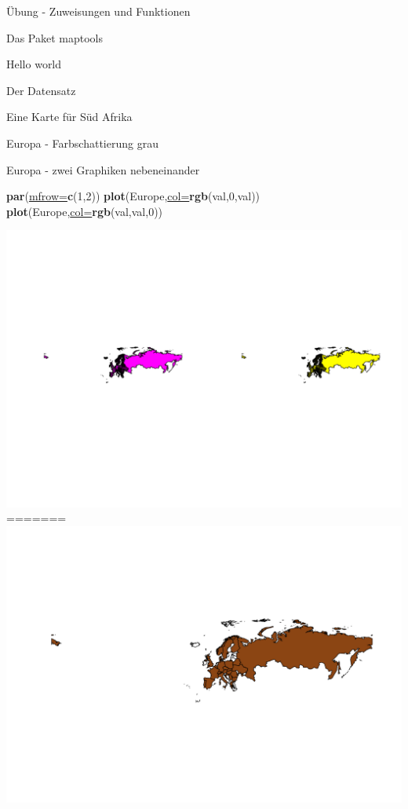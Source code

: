 \documentclass[ignorenonframetext,]{beamer}
\newenvironment{Shaded}{\begin{snugshade}}{\end{snugshade}}
\newcommand{\DataTypeTok}[1]{\textcolor[rgb]{0.74,0.68,0.62}{\underline{#1}}}
\newcommand{\DecValTok}[1]{\textcolor[rgb]{0.27,0.67,0.26}{#1}}
\newcommand{\KeywordTok}[1]{\textcolor[rgb]{0.26,0.66,0.93}{\textbf{#1}}}
\newcommand{\NormalTok}[1]{\textcolor[rgb]{0.74,0.68,0.62}{#1}}
\begin{document}
\begin{frame}[fragile]{Übung - Zuweisungen und Funktionen}
\begin{frame}[fragile]{Das Paket maptools}
\begin{frame}[fragile]{Hello world}
\begin{frame}[fragile]{Der Datensatz}
\begin{frame}[fragile]{Eine Karte für Süd Afrika}
\begin{frame}[fragile]{Europa - Farbschattierung grau}
\end{frame}

\begin{frame}[fragile]{Europa - zwei Graphiken nebeneinander}
\protect\hypertarget{europa---zwei-graphiken-nebeneinander}{}

\begin{Shaded}
\begin{Highlighting}[]
\KeywordTok{par}\NormalTok{(}\DataTypeTok{mfrow=}\KeywordTok{c}\NormalTok{(}\DecValTok{1}\NormalTok{,}\DecValTok{2}\NormalTok{))}
\KeywordTok{plot}\NormalTok{(Europe,}\DataTypeTok{col=}\KeywordTok{rgb}\NormalTok{(val,}\DecValTok{0}\NormalTok{,val))}
\KeywordTok{plot}\NormalTok{(Europe,}\DataTypeTok{col=}\KeywordTok{rgb}\NormalTok{(val,val,}\DecValTok{0}\NormalTok{))}
\end{Highlighting}
\end{Shaded}

\includegraphics{Geomedizin_files/figure-beamer/unnamed-chunk-83-1.pdf}
=======
\includegraphics{Geomedizin_files/figure-beamer/unnamed-chunk-99-1.pdf}


\end{frame}
\end{frame}
\end{frame}
\end{frame}
\end{frame}
\end{frame}
\end{document}
